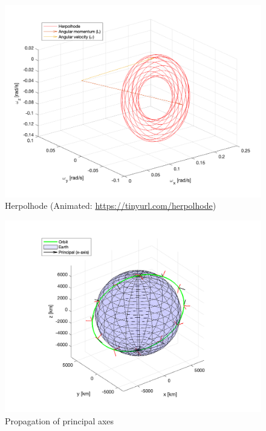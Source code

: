 \begin{figure}[H]
\centering
\includegraphics[scale=0.6]{Images/ps3_problem7b.png}
\caption{Herpolhode (Animated: \protect\url{https://tinyurl.com/herpolhode})}
\label{fig:ps3_problem7b}
\end{figure}

\begin{figure}[H]
\centering
\includegraphics[scale=0.6]{Images/ps3_problem7c_principal.png}
\caption{Propagation of principal axes}
\label{fig:ps3_problem7c}
\end{figure}

